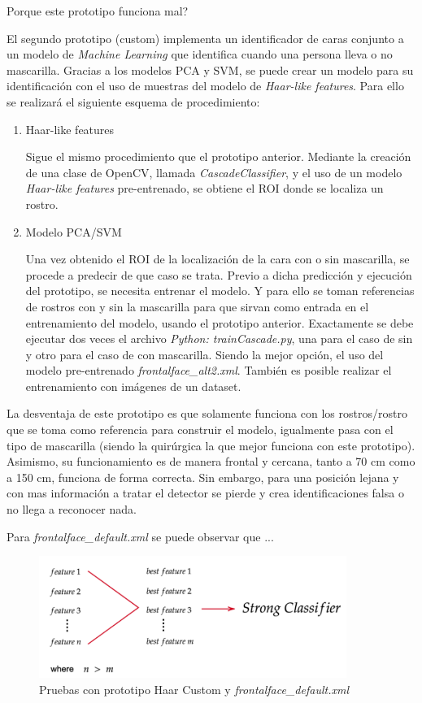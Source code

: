 Porque este prototipo funciona mal?

El segundo prototipo (custom) implementa un identificador de caras conjunto a un modelo de \textit{Machine Learning} que identifica cuando una persona lleva o no mascarilla. Gracias a los modelos PCA y SVM, se puede crear un modelo para su identificación con el uso de muestras del modelo de \textit{Haar-like features}. Para ello se realizará el siguiente esquema de procedimiento:

\begin{enumerate}
	\item Haar-like features
	
	Sigue el mismo procedimiento que el prototipo anterior. Mediante la creación de una clase de OpenCV, llamada \textit{CascadeClassifier}, y el uso de un modelo \textit{Haar-like features} pre-entrenado, se obtiene el ROI donde se localiza un rostro.
	
	\item Modelo PCA/SVM
	
	Una vez obtenido el ROI de la localización de la cara con o sin mascarilla, se procede a predecir de que caso se trata. Previo a dicha predicción y ejecución del prototipo, se necesita entrenar el modelo. Y para ello se toman referencias de rostros con y sin la mascarilla para que sirvan como entrada en el entrenamiento del modelo, usando el prototipo anterior. Exactamente se debe ejecutar dos veces el archivo \textit{Python: trainCascade.py}, una para el caso de sin y otro para el caso de con mascarilla. Siendo la mejor opción, el uso del modelo pre-entrenado \textit{frontalface\_alt2.xml}. También es posible realizar el entrenamiento con imágenes de un dataset.
\end{enumerate}

La desventaja de este prototipo es que solamente funciona con los rostros/rostro que se toma como referencia para construir el modelo, igualmente pasa con el tipo de mascarilla (siendo la quirúrgica la que mejor funciona con este prototipo). Asimismo, su funcionamiento es de manera frontal y cercana, tanto a 70 cm como a 150 cm, funciona de forma correcta. Sin embargo, para una posición lejana y con mas información a tratar el detector se pierde y crea identificaciones falsa o no llega a reconocer nada.

Para \textit{frontalface\_default.xml} se puede observar que ...

\begin{figure}[htp]
	\centering
	\includegraphics[width=10cm]{imagenes/ada1.png}
	\caption{Pruebas con prototipo Haar Custom y \textit{frontalface\_default.xml}}
	\label{fig:haarCustom1}
\end{figure}

